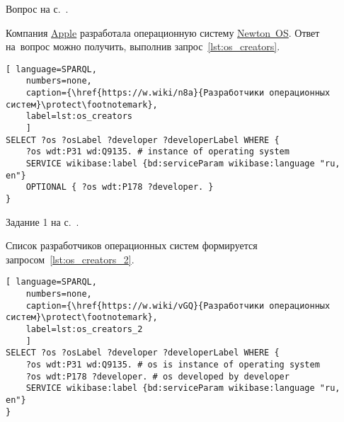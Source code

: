 \begin{task}
    \label{answer:what_system_created}
    \AnswerBackref Вопрос на с.~\pageref{lst:inception_time_of_operating_systems}.

    Компания \href{https://w.wiki/n8S}{Apple} разработала 
    операционную систему \href{https://w.wiki/n8P}{Newton~OS}. 
    Ответ на~вопрос можно получить, выполнив запрос~\ref{lst:os_creators}.

\begin{lstlisting}[ language=SPARQL, 
    numbers=none,
    caption={\href{https://w.wiki/n8a}{Разработчики операционных систем}\protect\footnotemark},
	label=lst:os_creators
	]
SELECT ?os ?osLabel ?developer ?developerLabel WHERE {
	?os wdt:P31 wd:Q9135. # instance of operating system
	SERVICE wikibase:label {bd:serviceParam wikibase:language "ru, en"}
	OPTIONAL { ?os wdt:P178 ?developer. }
}\end{lstlisting}
\end{task}




\newpage
\begin{task}
	\label{answer:os_and_developers}
    \AnswerBackref Задание 1 на с.~\pageref{tasks:operating_system_tasks}.

	Список разработчиков операционных систем формируется запросом~\ref{lst:os_creators_2}.

\begin{lstlisting}[ language=SPARQL, 
    numbers=none,
    caption={\href{https://w.wiki/vGQ}{Разработчики операционных систем}\protect\footnotemark},
    label=lst:os_creators_2
	]
SELECT ?os ?osLabel ?developer ?developerLabel WHERE {
    ?os wdt:P31 wd:Q9135. # os is instance of operating system
    ?os wdt:P178 ?developer. # os developed by developer
    SERVICE wikibase:label {bd:serviceParam wikibase:language "ru, en"}
}\end{lstlisting}
\end{task}


